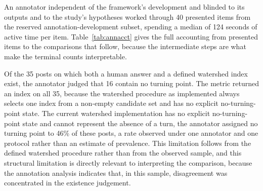 \documentclass[fleqn,10pt]{wlscirep}
\begin{document}
An annotator independent of the framework's development and blinded to its outputs and to the study's hypotheses worked through 40 presented items from the reserved annotation-development subset, spending a median of 124 seconds of active time per item. Table~\ref{tab:annacct} gives the full accounting from presented items to the comparisons that follow, because the intermediate steps are what make the terminal counts interpretable.

Of the 35 posts on which both a human answer and a defined watershed index exist, the annotator judged that 16 contain no turning point. The metric returned an index on all 35, because the watershed procedure as implemented always selects one index from a non-empty candidate set and has no explicit no-turning-point state. The current watershed implementation has no explicit no-turning-point state and cannot represent the absence of a turn, the annotator assigned no turning point to 46\% of these posts, a rate observed under one annotator and one protocol rather than an estimate of prevalence. This limitation follows from the defined watershed procedure rather than from the observed sample, and this structural limitation is directly relevant to interpreting the comparison, because the annotation analysis indicates that, in this sample, disagreement was concentrated in the existence judgement.
\end{document}
